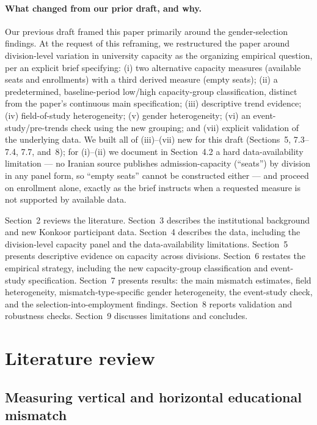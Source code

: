 \documentclass[11pt]{article}
\begin{document}
\paragraph{What changed from our prior draft, and why.} Our previous draft framed this paper primarily around the gender-selection findings. At the request of this reframing, we restructured the paper around division-level variation in university capacity as the organizing empirical question, per an explicit brief specifying: (i) two alternative capacity measures (available seats and enrollments) with a third derived measure (empty seats); (ii) a predetermined, baseline-period low/high capacity-group classification, distinct from the paper's continuous main specification; (iii) descriptive trend evidence; (iv) field-of-study heterogeneity; (v) gender heterogeneity; (vi) an event-study/pre-trends check using the new grouping; and (vii) explicit validation of the underlying data. We built all of (iii)--(vii) new for this draft (Sections~5, 7.3--7.4, 7.7, and~8); for (i)--(ii) we document in Section~4.2 a hard data-availability limitation --- no Iranian source publishes admission-capacity (``seats'') by division in any panel form, so ``empty seats'' cannot be constructed either --- and proceed on enrollment alone, exactly as the brief instructs when a requested measure is not supported by available data.

Section~2 reviews the literature. Section~3 describes the institutional background and new Konkoor participant data. Section~4 describes the data, including the division-level capacity panel and the data-availability limitations. Section~5 presents descriptive evidence on capacity across divisions. Section~6 restates the empirical strategy, including the new capacity-group classification and event-study specification. Section~7 presents results: the main mismatch estimates, field heterogeneity, mismatch-type-specific gender heterogeneity, the event-study check, and the selection-into-employment findings. Section~8 reports validation and robustness checks. Section~9 discusses limitations and concludes.

\section{Literature review}

\subsection{Measuring vertical and horizontal educational mismatch}
\end{document}

